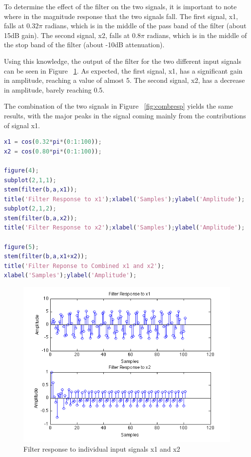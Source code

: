\documentclass{article}
\begin{document}
\begin{par}
To determine the effect of the filter on the two signals, it is important to note where in the magnitude response that the two signals fall.  The first signal, x1, falls at $0.32\pi$ radians, which is in the middle of the pass band of the filter (about 15dB gain).  The second signal, x2, falls at $0.8\pi$ radians, which is in the middle of the stop band of the filter (about -10dB attenuation).
\end{par} \vspace{1em}
\begin{par}
Using this knowledge, the output of the filter for the two different input signals can be seen in Figure ~\ref{fig:indresp}.  As expected, the first signal, x1, has a significant gain in amplitude, reaching a value of almost 5. The second signal, x2, has a decrease in amplitude, barely reaching 0.5.
\end{par} \vspace{1em}
\begin{par}
The combination of the two signals in Figure ~\ref{fig:combresp} yields the same results, with the major peaks in the signal coming mainly from the contributions of signal x1.
\end{par} \vspace{1em}
\begin{lstlisting}[language=matlab]
x1 = cos(0.32*pi*(0:1:100));
x2 = cos(0.80*pi*(0:1:100));

figure(4);
subplot(2,1,1);
stem(filter(b,a,x1));
title('Filter Response to x1');xlabel('Samples');ylabel('Amplitude');
subplot(2,1,2);
stem(filter(b,a,x2));
title('Filter Response to x2');xlabel('Samples');ylabel('Amplitude');

figure(5);
stem(filter(b,a,x1+x2));
title('Filter Reponse to Combined x1 and x2');
xlabel('Samples');ylabel('Amplitude');
\end{lstlisting}

\begin{figure}[here]
	\begin{center}
		\includegraphics [width=5in]{Project2_04.png}
		\caption{Filter response to individual input signals x1 and x2}
		\label{fig:indresp}
	\end{center}
\end{figure}
\end{document}
